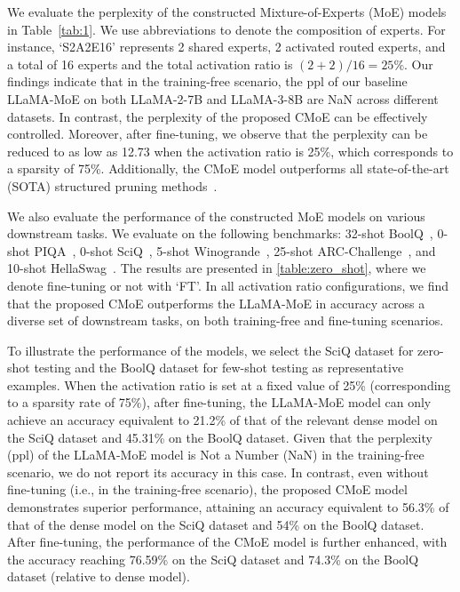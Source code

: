

We evaluate the perplexity of the constructed Mixture-of-Experts (MoE) models in Table~\ref{tab:1}. We use abbreviations to denote the composition of experts. For instance, `S2A2E16' represents 2 shared experts, 2 activated routed experts, and a total of 16 experts and the total activation ratio is $(2+2)/16 = 25\%$. 
Our findings indicate that in the training-free scenario, the ppl of our baseline LLaMA-MoE on both LLaMA-2-7B and LLaMA-3-8B are NaN across different datasets. In contrast, the perplexity of the proposed CMoE can be effectively controlled. Moreover, after fine-tuning, we observe that the perplexity can be reduced to as low as 12.73 when the activation ratio is 25\%, which corresponds to a sparsity of 75\%. Additionally, the CMoE model outperforms all state-of-the-art (SOTA) structured pruning methods~\cite{dejavu, slicegpt, fusegpt}. 

% 

We also evaluate the performance of the constructed MoE models on various downstream tasks. 
We evaluate on the following benchmarks: 
32-shot BoolQ~\cite{clark2019boolq}, 0-shot PIQA~\cite{bisk2020piqa}, 0-shot SciQ~\cite{welbl2017crowdsourcing}, 5-shot Winogrande~\cite{sakaguchi2021winogrande}, 25-shot ARC-Challenge~\cite{clark2018think}, and 10-shot HellaSwag~\cite{zellers2019hellaswag}.
The results are presented in \cref{table:zero_shot}, where we denote fine-tuning or not with `FT'.
In all activation ratio configurations, we find that the proposed CMoE outperforms the LLaMA-MoE in accuracy across a diverse set of downstream tasks, on both training-free and fine-tuning scenarios. 


To illustrate the performance of the models, we select the SciQ dataset for zero-shot testing and the BoolQ dataset for few-shot testing as representative examples. When the activation ratio is set at a fixed value of 25\% (corresponding to a sparsity rate of 75\%), after fine-tuning, the LLaMA-MoE model can only achieve an accuracy equivalent to 21.2\% of that of the relevant dense model on the SciQ dataset and 45.31\% on the BoolQ dataset. Given that the perplexity (ppl) of the LLaMA-MoE model is Not a Number (NaN) in the training-free scenario, we do not report its accuracy in this case.
In contrast, even without fine-tuning (i.e., in the training-free scenario), the proposed CMoE model demonstrates superior performance, attaining an accuracy equivalent to 56.3\% of that of the dense model on the SciQ dataset and 54\% on the BoolQ dataset. After fine-tuning, the performance of the CMoE model is further enhanced, with the accuracy reaching 76.59\% on the SciQ dataset and 74.3\% on the BoolQ dataset (relative to dense model).


